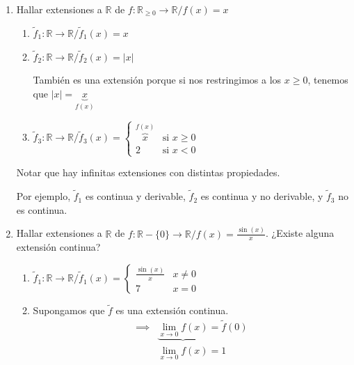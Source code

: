 \begin{enumerate}
    \item Hallar extensiones a $\mathbb{R}$ de $f: \mathbb{R}_{\geq 0} \to 
        \mathbb{R} / f(x) = x$

        \begin{enumerate}
            \item $\tilde{f}_1 : \mathbb{R} \to \mathbb{R} / \tilde{f}_1(x)=x$
            \item $\tilde{f}_2 : \mathbb{R}\to\mathbb{R} / \tilde{f}_2(x)=|x|$

                También es una extensión porque si nos restringimos a los 
                $x \geq 0$, tenemos que $|x| = \underbrace{x}_{f(x)}$

            \item $\tilde{f}_3: \mathbb{R}\to\mathbb{R}/\tilde{f}_3(x)=
                \begin{cases}
                    \overbrace{x}^{f(x)} & \text{si } x \geq 0 \\
                    2 & \text{si } x<0
                \end{cases}$

        \end{enumerate}
    Notar que hay infinitas extensiones con distintas propiedades.
    
    Por ejemplo, $\tilde{f}_1$ es continua y derivable, $\tilde{f}_2$
    es continua y no derivable, y $\tilde{f}_3$ no es continua.

    \item Hallar extensiones a $\mathbb{R}$ de $f: \mathbb{R}-\{0\} \to
        \mathbb{R} / f(x) = \frac{\sin{(x)}}{x}$. ¿Existe alguna extensión
        continua?

        \begin{enumerate}
            \item $\tilde{f}_1: \mathbb{R}\to\mathbb{R} / \tilde{f}_1 (x) =
                \begin{cases}
                    \frac{\sin{(x)}}{x} & x \neq 0 \\
                    7 & x = 0
                \end{cases}$

            \item Supongamos que $\tilde{f}$ es una extensión continua. 
                \begin{align*}
                    \implies &\underbrace{\lim_{x\to 0} f(x)} = \tilde{f}(0)\\
                             &\lim_{x\to 0} f(x) = 1
                \end{align*}


\end{enumerate}
\end{enumerate}
